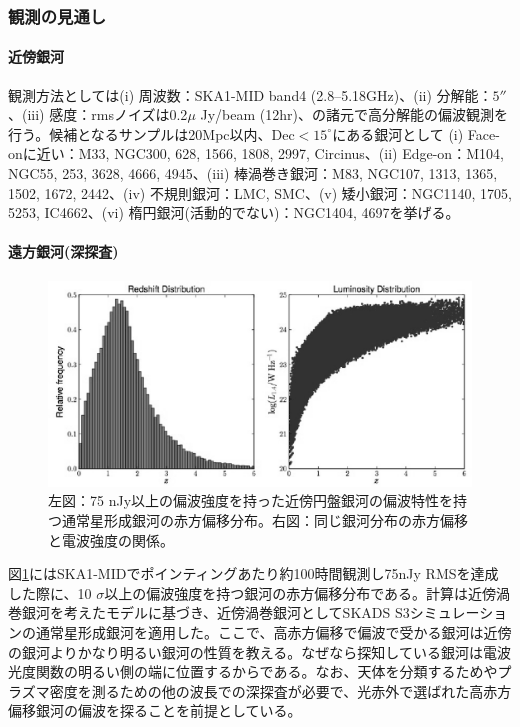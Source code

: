 \subsubsection{観測の見通し}
\label{c06.s2.ss3.sss2}

\paragraph{近傍銀河}

観測方法としては(i) 周波数：SKA1-MID band4 (2.8--5.18GHz)、(ii) 分解能：$5''$、(iii) 感度：rmsノイズは0.2$\mu$ Jy/beam (12hr)、の諸元で高分解能の偏波観測を行う。候補となるサンプルは20Mpc以内、Dec$<15^\circ$にある銀河として (i) Face-onに近い：M33, NGC300, 628, 1566, 1808, 2997, Circinus、(ii) Edge-on：M104, NGC55, 253, 3628, 4666, 4945、(iii) 棒渦巻き銀河：M83, NGC107, 1313, 1365, 1502, 1672, 2442、(iv) 不規則銀河：LMC, SMC、(v) 矮小銀河：NGC1140, 1705, 5253, IC4662、(vi) 楕円銀河(活動的でない)：NGC1404, 4697を挙げる。

\paragraph{遠方銀河(深探査)}

\begin{figure}[tbp]
\begin{center}
\includegraphics[width=0.8\linewidth]{magnetism/c06.s2.ss3.f2.eps}
\end{center}
\caption{
左図：75 nJy以上の偏波強度を持った近傍円盤銀河の偏波特性を持つ通常星形成銀河の赤方偏移分布。右図：同じ銀河分布の赤方偏移と電波強度の関係。
}\label{c06.s2.ss3.f2}
\end{figure}

図\ref{c06.s2.ss3.f2}にはSKA1-MIDでポインティングあたり約100時間観測し75nJy RMSを達成した際に、10 $\sigma$以上の偏波強度を持つ銀河の赤方偏移分布である。計算は近傍渦巻銀河を考えたモデル\citep{2009ApJ...693.1392S}に基づき、近傍渦巻銀河としてSKADS S3シミュレーション\citep{2008MNRAS.388.1335W}の通常星形成銀河を適用した。ここで、高赤方偏移で偏波で受かる銀河は近傍の銀河よりかなり明るい銀河の性質を教える。なぜなら探知している銀河は電波光度関数の明るい側の端に位置するからである。なお、天体を分類するためやプラズマ密度を測るための他の波長での深探査が必要で、光赤外で選ばれた高赤方偏移銀河の偏波を探ることを前提としている。

